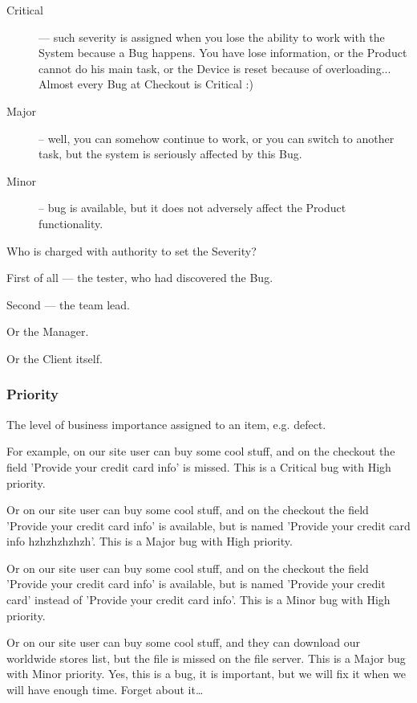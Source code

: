 \begin{description}
\item[Critical] — such severity is assigned when you lose the ability to work with the System because a Bug happens. You have lose information, or the Product cannot do his main task, or the Device is reset because of overloading... Almost every Bug at Checkout is Critical :)

\item[Major] – well, you can somehow continue to work, or you can switch to another task, but the system is seriously affected by this Bug.

\item[Minor] – bug is available, but it does not adversely affect the Product functionality.                                                                                     \end{description}

Who is charged with authority to set the Severity? 

First of all — the tester, who had discovered the Bug. 

Second — the team lead. 

Or the Manager. 

Or the Client itself.

\subsubsection{Priority}
\label{sec:Priority}

The level of business importance assigned to an item, e.g. defect.

For example, on our site user can buy some cool stuff, and on the checkout the field 'Provide your credit card info' is missed. This is a Critical bug with High priority.

Or on our site user can buy some cool stuff, and on the checkout the field 'Provide your credit card info' is available, but is named 'Provide your credit card info hzhzhzhzhzh'. This is a Major bug with High priority.

Or on our site user can buy some cool stuff, and on the checkout the field 'Provide your credit card info' is available, but is named 'Provide your credit card' instead of 'Provide your credit card info'. This is a Minor bug with High priority.

Or on our site user can buy some cool stuff, and they can download our worldwide stores list, but the file is missed on the file server. This is a Major bug with Minor priority. Yes, this is a bug, it is important, but we will fix it when we will have enough time. Forget about it\ldots
